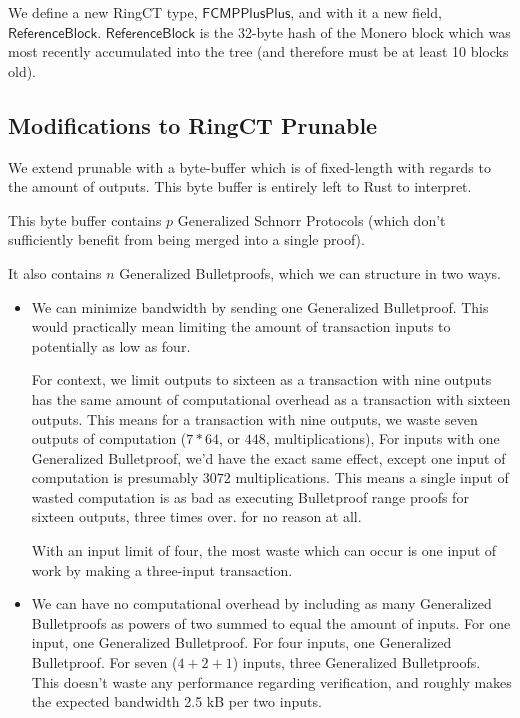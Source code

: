 \documentclass[]{article}
\begin{document}
We define a new RingCT type, $\mathsf{FCMPPlusPlus}$, and with it a new field, $\mathsf{ReferenceBlock}$. $\mathsf{ReferenceBlock}$ is the 32-byte hash of the Monero block which was most recently accumulated into the tree (and therefore must be at least 10 blocks old).

\subsection{Modifications to RingCT Prunable}

We extend prunable with a byte-buffer which is of fixed-length with regards to the amount of outputs. This byte buffer is entirely left to Rust to interpret.

This byte buffer contains $p$ Generalized Schnorr Protocols (which don't sufficiently benefit from being merged into a single proof).

It also contains $n$ Generalized Bulletproofs, which we can structure in two ways.

\begin{itemize}
	\item
	We can minimize bandwidth by sending one Generalized Bulletproof. This would practically mean limiting the amount of transaction inputs to potentially as low as four.
	
	For context, we limit outputs to sixteen as a transaction with nine outputs has the same amount of computational overhead as a transaction with sixteen outputs. This means for a transaction with nine outputs, we waste seven outputs of computation ($7 * 64$, or $448$, multiplications), For inputs with one Generalized Bulletproof, we'd have the exact same effect, except one input of computation is presumably $3072$ multiplications. This means a single input of wasted computation is as bad as executing Bulletproof range proofs for sixteen outputs, three times over. for no reason at all.
	
	With an input limit of four, the most waste which can occur is one input of work by making a three-input transaction.
	\item
	We can have no computational overhead by including as many Generalized Bulletproofs as powers of two summed to equal the amount of inputs. For one input, one Generalized Bulletproof. For four inputs, one Generalized Bulletproof. For seven ($4 + 2 + 1$) inputs, three Generalized Bulletproofs. This doesn't waste any performance regarding verification, and roughly makes the expected bandwidth 2.5 kB per two inputs.
\end{itemize}
\end{document}
